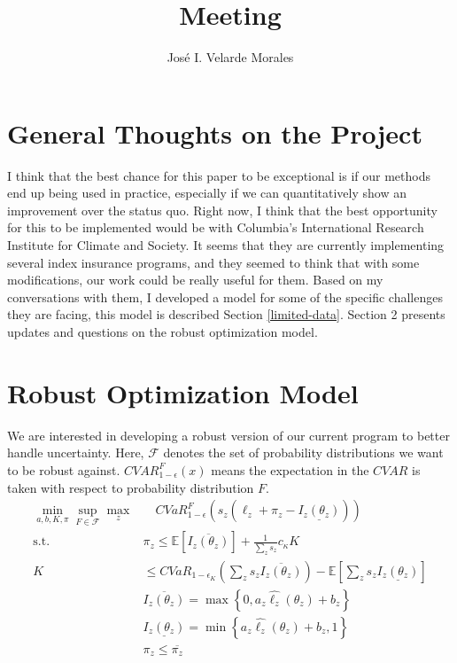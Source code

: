 \documentclass[11pt]{article}
\title{Meeting}
\author{José I. Velarde Morales}
\begin{document}
\maketitle
\section{General Thoughts on the Project}
  I think that the best chance for this paper to be exceptional is if our methods end up being used in practice, especially if we can quantitatively show an improvement over the status quo. Right now, I think that the best opportunity for this to be implemented would be with Columbia's International Research Institute for Climate and Society. It seems that they are currently implementing several index insurance programs, and they seemed to think that with some modifications, our work could be really useful for them. Based on my conversations with them, I developed a model for some of the specific challenges they are facing, this model is described Section \ref{limited-data}. Section 2 presents updates and questions on the robust optimization model. 

\section{Robust Optimization Model}
  We are interested in developing a robust version of our current program to better handle uncertainty. 
  Here, $\mathcal{F}$ denotes the set of probability distributions we want to be robust against. $CVAR_{1-\epsilon}^F(x)$ means the expectation in the $CVAR$ is taken with respect to probability distribution $F$.  
    \begin{align}
      \min_{a,b,K,\pi} \sup_{F \in \mathcal{F}} \max_z &\quad CVaR^F_{1-\epsilon}\left (s_z \left (\ell_z  + \pi_z - \underline{I_z(\theta_z)}\right ) \right )\\
      \text{s.t.   } & \pi_z  \leq \mathbb{E}\left [ \overline{I_z(\theta_z)} \right ] + \frac{1}{\sum_z s_z} c_{\kappa} K \\
      K &\leq CVaR_{1-\epsilon_K} \left ( \sum_z s_z\overline{I_z(\theta_z)} \right ) - \mathbb{E}\left [ \sum_z s_z\underline{I_z(\theta_z)} \right ]\\
      &\overline{I_z(\theta_z)} = \max \left \{0,a_z\hat{\ell_z}(\theta_z) + b_z \right \}\\
      &\underline{I_z(\theta_z)} = \min \left \{a_z\hat{\ell_z}(\theta_z)+b_z,1 \right \}\\
      &\pi_z \leq \overline{\pi_z}
    \end{align}
\end{document}
